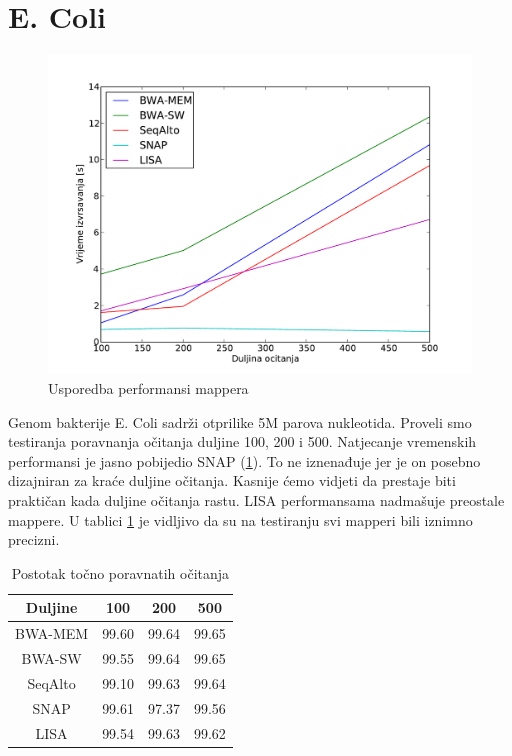 \documentclass[times, utf8, diplomski]{fer}
\begin{document}
\section {E. Coli}

\begin{figure}[H]
\centering
\includegraphics[width=1.0\textwidth]{../img/ecoli-time.pdf}
\caption{Usporedba performansi mappera}
\label{ecoli-time}
\end{figure}

Genom bakterije E. Coli sadrži otprilike 5M parova nukleotida. Proveli smo testiranja poravnanja očitanja duljine 100, 200 i 500. Natjecanje vremenskih performansi je jasno pobijedio SNAP (\ref{ecoli-time}). To ne iznenađuje jer je on posebno dizajniran za kraće duljine očitanja. Kasnije ćemo vidjeti da prestaje biti praktičan kada duljine očitanja rastu. LISA performansama nadmašuje preostale mappere. U tablici \ref{ecoli-correct} je vidljivo da su na testiranju svi mapperi bili iznimno precizni.

\begin{table}[H]
\centering
\begin{tabular}{|c||c|c|c|}
\hline
	Duljine & 100 & 200 & 500\\
\hline
\hline
	BWA-MEM & 99.60 & 99.64 & 99.65\\
\hline
	BWA-SW  & 99.55 & 99.64 & 99.65\\
\hline
	SeqAlto & 99.10 & 99.63 & 99.64\\
\hline
	SNAP    & 99.61 & 97.37 & 99.56\\
\hline
	LISA    & 99.54 & 99.63 & 99.62\\
\hline
\end{tabular}
\caption{Postotak točno poravnatih očitanja}\label{ecoli-correct}
\end{table}
\end{document}
